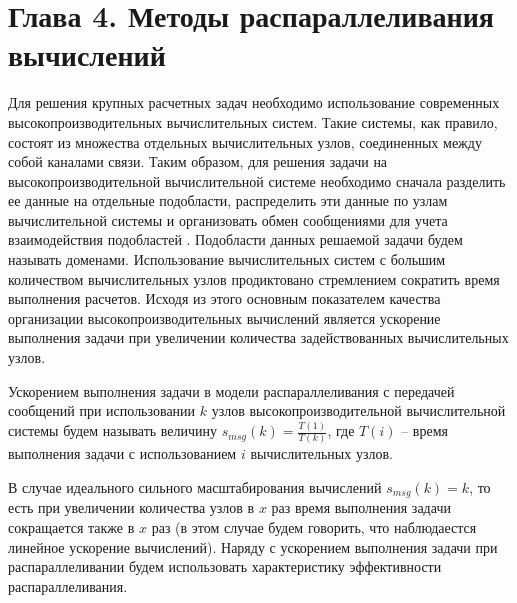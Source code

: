 \newpage
\section*{Глава 4. Методы распараллеливания вычислений} %
\addtocounter{section}{1}                                                    %
\setcounter{subsection}{0}
\setcounter{figure}{0}
\setcounter{equation}{0}
\setcounter{table}{0}
\setcounter{theorem}{0}
\setcounter{lemma}{0}
\setcounter{definition}{0}

Для решения крупных расчетных задач необходимо использование современных высокопроизводительных вычислительных систем.
Такие системы, как правило, состоят из множества отдельных вычислительных узлов, соединенных между собой каналами связи.
Таким образом, для решения задачи на высокопроизводительной вычислительной системе необходимо сначала разделить ее данные на отдельные подобласти, распределить эти данные по узлам вычислительной системы и организовать обмен сообщениями для учета взаимодействия подобластей \cite{GOST57700HPC}.
Подобласти данных решаемой задачи будем называть доменами\label{term:domain}.
Использование вычислительных систем с большим количеством вычислительных узлов продиктовано стремлением сократить время выполнения расчетов.
Исходя из этого основным показателем качества организации высокопроизводительных вычислений является ускорение выполнения задачи при увеличении количества задействованных вычислительных узлов.

\begin{definition}
Ускорением выполнения задачи в модели распараллеливания с передачей сообщений\label{term:msg_speedup} при использовании $k$ узлов высокопроизводительной вычислительной системы будем называть величину $s_{msg}(k) = \frac{T(1)}{T(k)}$, где $T(i)$ -- время выполнения задачи с использованием $i$ вычислительных узлов. 
\end{definition}

В случае идеального сильного масштабирования вычислений\label{term:strong_scale} $s_{msg}(k) = k$, то есть при увеличении количества узлов в $x$ раз время выполнения задачи сокращается также в $x$ раз (в этом случае будем говорить, что наблюдаестся линейное ускорение вычислений).
Наряду с ускорением выполнения задачи при распараллеливании будем использовать характеристику эффективности распараллеливания.

